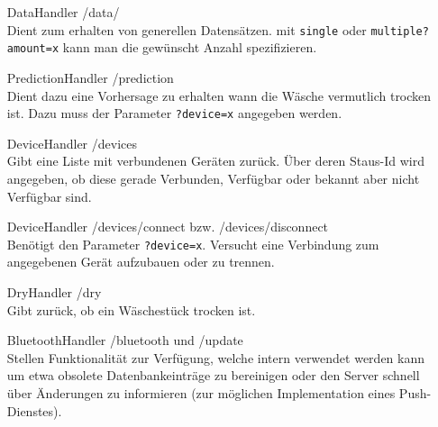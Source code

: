 \begin{description}
	\begin{enumerate}
		\item[DataHandler] /data/ \\
		Dient zum erhalten von generellen Datensätzen. mit \texttt{single} oder \texttt{multiple?amount=x} kann man die gewünscht Anzahl spezifizieren.
		\item[PredictionHandler] /prediction \\
		Dient dazu eine Vorhersage zu erhalten wann die Wäsche vermutlich trocken ist. Dazu muss der Parameter \texttt{?device=x} angegeben werden.
		\item[DeviceHandler] /devices \\
		Gibt eine Liste mit verbundenen Geräten zurück. Über deren Staus-Id wird angegeben, ob diese gerade Verbunden, Verfügbar oder bekannt aber nicht Verfügbar sind.
		\item[DeviceHandler] /devices/connect bzw. /devices/disconnect \\
		Benötigt den Parameter \texttt{?device=x}. Versucht eine Verbindung zum angegebenen Gerät aufzubauen oder zu trennen.
		\item[DryHandler] /dry \\
		Gibt zurück, ob ein Wäschestück trocken ist.
		\item[BluetoothHandler] /bluetooth und /update \\
		Stellen Funktionalität zur Verfügung, welche intern verwendet werden kann um etwa obsolete Datenbankeinträge zu bereinigen oder den Server schnell über Änderungen zu informieren (zur möglichen Implementation eines Push-Dienstes).
	\end{enumerate}
	
\end{description}


